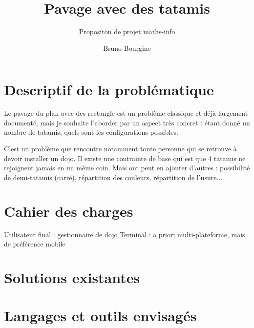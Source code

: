 \documentclass{scrartcl}
\begin{document}
    \title{Pavage avec des tatamis}
    \subtitle{Propositon de projet maths-info}
    \author{Bruno Bourgine\\}
    \maketitle

    \section{Descriptif de la problématique}

    Le pavage du plan avec des rectangle est un problème classique et déjà largement documenté,
    mais je souhaite l'aborder par un aspect très concret : étant donné un nombre de tatamis, quels sont les 
    configurations possibles.
    
    C'est un problème que rencontre notamment toute personne qui se retrouve à devoir installer un dojo.
    Il existe une contrainte de base qui est que 4 tatamis ne rejoignent jamais en un même coin. Mais ont peut
    en ajouter d'autres : possibilité de demi-tatamis (carré), répartition des couleurs, répartition de l'usure...

    \section{Cahier des charges}

    Utilisateur final : gestionnaire de dojo
    Terminal : a priori multi-plateforme, mais de préférence mobile

    \section{Solutions existantes}

    \section{Langages et outils envisagés}
\end{document}
